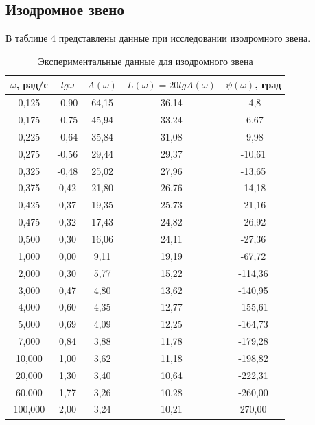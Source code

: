 \documentclass[a4paper,12pt]{article} %
\begin{document}
\newpage
\begin{center}
\section{Изодромное звено}
\end{center}

В таблице 4 представлены данные при исследовании изодромного звена.
\begin{table}[h!]
	\renewcommand{\arraystretch}{1.8} %
	\centering
	\begin{threeparttable}
		\caption{Экспериментальные данные для изодромного звена}
		\begin{tabular}{|c|c|c|c|c|}
			\hline $\omega$, рад/с & $lg\omega$ & $A(\omega)$ & $L(\omega)=20lgA(\omega)$ & $\psi(\omega)$, град\\
			\hline 0,125 & -0,90 & 64,15 & 36,14 & -4,8\\
			\hline 0,175 & -0,75 & 45,94 & 33,24 & -6,67\\
			\hline 0,225 & -0,64 & 35,84 & 31,08 & -9,98\\
			\hline 0,275 & -0,56 & 29,44 & 29,37 & -10,61\\
			\hline 0,325 & -0,48 & 25,02 & 27,96 & -13,65\\
			\hline 0,375 & 0,42 & 21,80 & 26,76 & -14,18\\
			\hline 0,425 & 0,37 & 19,35 & 25,73 & -21,16\\
			\hline 0,475 & 0,32 & 17,43 & 24,82 & -26,92\\
			\hline 0,500 & 0,30 & 16,06 & 24,11 & -27,36\\
			\hline 1,000 & 0,00 & 9,11 & 19,19 & -67,72\\
			\hline 2,000 & 0,30 & 5,77 & 15,22 & -114,36\\
			\hline 3,000 & 0,47 & 4,80 & 13,62 & -140,95\\
			\hline 4,000 & 0,60 & 4,35 & 12,77 & -155,61\\
			\hline 5,000 & 0,69 & 4,09 & 12,25 & -164,73\\
			\hline 7,000 & 0,84 & 3,88 & 11,78 & -179,28\\
			\hline 10,000 & 1,00 & 3,62 & 11,18 & -198,82\\			
			\hline 20,000 & 1,30 & 3,40 & 10,64 & -222,31\\			
			\hline 60,000 & 1,77 & 3,26 & 10,28 & -260,00\\			
			\hline 100,000 & 2,00 & 3,24 & 10,21 & 270,00\\
			\hline
		\end{tabular}
	\end{threeparttable}
\end{table}
\end{document}
